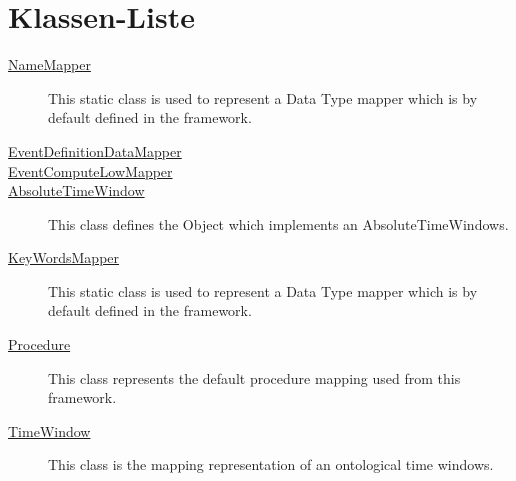 \section{Klassen-Liste}
\begin{description}
\item[{\hyperlink{ontologyFramework.OFDataMapping.ReservatedDataType.NameMapper-class}{NameMapper}}]
This static class is used to represent a Data Type mapper
 which is by default defined in the framework.
\hfill\pageref{ontologyFramework.OFDataMapping.ReservatedDataType.NameMapper-class}

\item[{\hyperlink{ontologyFramework.OFDataMapping.ReservatedDataType.EventDefinitionDataMapper-class}{EventDefinitionDataMapper}}]

\hfill\pageref{ontologyFramework.OFDataMapping.ReservatedDataType.EventDefinitionDataMapper-class}

\item[{\hyperlink{ontologyFramework.OFDataMapping.ReservatedDataType.EventComputeLowMapper-class}{EventComputeLowMapper}}]

\hfill\pageref{ontologyFramework.OFDataMapping.ReservatedDataType.EventComputeLowMapper-class}

\item[{\hyperlink{ontologyFramework.OFDataMapping.ReservatedDataType.AbsoluteTimeWindow-class}{AbsoluteTimeWindow}}]
This class defines the Object which implements an AbsoluteTimeWindows.
\hfill\pageref{ontologyFramework.OFDataMapping.ReservatedDataType.AbsoluteTimeWindow-class}

\item[{\hyperlink{ontologyFramework.OFDataMapping.ReservatedDataType.KeyWordsMapper-class}{KeyWordsMapper}}]
This static class is used to represent a Data Type mapper
 which is by default defined in the framework.
\hfill\pageref{ontologyFramework.OFDataMapping.ReservatedDataType.KeyWordsMapper-class}

\item[{\hyperlink{ontologyFramework.OFDataMapping.ReservatedDataType.Procedure-class}{Procedure}}]
This class represents the default procedure mapping used 
 from this framework.
\hfill\pageref{ontologyFramework.OFDataMapping.ReservatedDataType.Procedure-class}

\item[{\hyperlink{ontologyFramework.OFDataMapping.ReservatedDataType.TimeWindow-class}{TimeWindow}}]
This class is the mapping representation of an ontological time windows.
\hfill\pageref{ontologyFramework.OFDataMapping.ReservatedDataType.TimeWindow-class}

\end{description}
